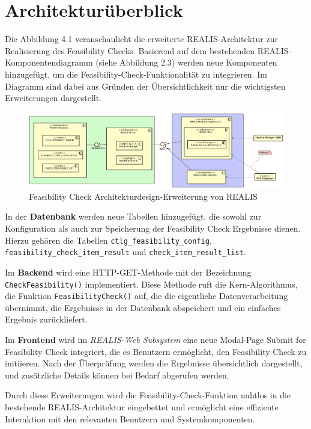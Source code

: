 \section{Architekturüberblick}

Die Abbildung 4.1 veranschaulicht die erweiterte REALIS-Architektur zur Realisierung des Feasibility Checks. Basierend auf dem bestehenden REALIS-Komponentendiagramm (siehe Abbildung 2.3) werden neue Komponenten hinzugefügt, um die Feasibility-Check-Funktionalität zu integrieren. Im Diagramm sind dabei aus Gründen der Übersichtlichkeit nur die wichtigsten Erweiterungen dargestellt.

\begin{figure}[!htbp]
    \centering
    \includegraphics[width=1\textwidth]{bilder/KomponentenDiagramm-REALIS-mitErweiterungen.png}
    \caption{Feasibility Check Architekturdesign-Erweiterung von \gls{REALIS}}
    \label{fig:feasibility-check-komponentendiagramm}
\end{figure}


In der \textbf{Datenbank} werden neue Tabellen hinzugefügt, die sowohl zur Konfiguration als auch zur Speicherung der Feasibility Check Ergebnisse dienen. Hierzu gehören die Tabellen \texttt{ctlg\_feasibility\_config}, \texttt{feasibility\_check\_item\_result} und \texttt{check\_item\_\-result\_\-list}.

Im \textbf{Backend} wird eine HTTP-GET-Methode mit der Bezeichnung \texttt{CheckFeasibility()} implementiert. Diese Methode ruft die Kern-Algorithmus, die Funktion \texttt{FeasibilityCheck()} auf, die die eigentliche Datenverarbeitung übernimmt, die Ergebnisse in der Datenbank abspeichert und ein einfaches Ergebnis zurückliefert.

Im \textbf{Frontend} wird im \textit{REALIS-Web Subsystem} eine neue Modal-Page \glqq Submit for Feasibility Check\grqq{} integriert, die es Benutzern ermöglicht, den Feasibility Check zu initiieren. Nach der Überprüfung werden die Ergebnisse übersichtlich dargestellt, und zusätzliche Details können bei Bedarf abgerufen werden. 

Durch diese Erweiterungen wird die Feasibility-Check-Funktion nahtlos in die bestehende REALIS-Architektur eingebettet und ermöglicht eine effiziente Interaktion mit den relevanten Benutzern und Systemkomponenten.


